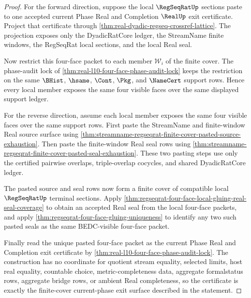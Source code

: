 \begin{proof}
For the forward direction, suppose the local $\RegSeqRatUp$ sections paste to one accepted current Phase Real and Completion $\RealUp$ exit certificate. Project that certificate through \autoref{thm:real-dyadic-regseq-crossref-lattice}. The projection exposes only the DyadicRatCore ledger, the StreamName finite windows, the RegSeqRat local sections, and the local Real seal.

Now restrict this four-face packet to each member $\mathcal{W}_i$ of the finite cover. The phase-audit lock of \autoref{thm:real-l10-four-face-phase-audit-lock} keeps the restriction on the same $\BHist$, $\hsame$, $\Cont$, $\Pkg$, and $\NameCert$ support rows. Hence every local member exposes the same four visible faces over the same displayed support ledger.

For the reverse direction, assume each local member exposes the same four visible faces over the same support rows. First paste the StreamName and finite-window Real source surface using \autoref{thm:streamname-regseqrat-finite-cover-pasted-source-exhaustion}. Then paste the finite-window Real seal rows using \autoref{thm:streamname-regseqrat-finite-cover-pasted-seal-exhaustion}. These two pasting steps use only the certified pairwise overlaps, triple-overlap cocycles, and shared DyadicRatCore ledger.

The pasted source and seal rows now form a finite cover of compatible local $\RegSeqRatUp$ terminal sections. Apply \autoref{thm:regseqrat-four-face-local-gluing-real-seal-coverage} to obtain an accepted Real seal from the local four-face packets, and apply \autoref{thm:regseqrat-four-face-gluing-uniqueness} to identify any two such pasted seals as the same BEDC-visible four-face packet.

Finally read the unique pasted four-face packet as the current Phase Real and Completion exit certificate by \autoref{thm:real-l10-four-face-phase-audit-lock}. The construction has no coordinate for quotient stream equality, selected limits, host real equality, countable choice, metric-completeness data, aggregate formalstatus rows, aggregate bridge rows, or ambient Real completeness, so the certificate is exactly the finite-cover current-phase exit surface described in the statement.
\end{proof}

